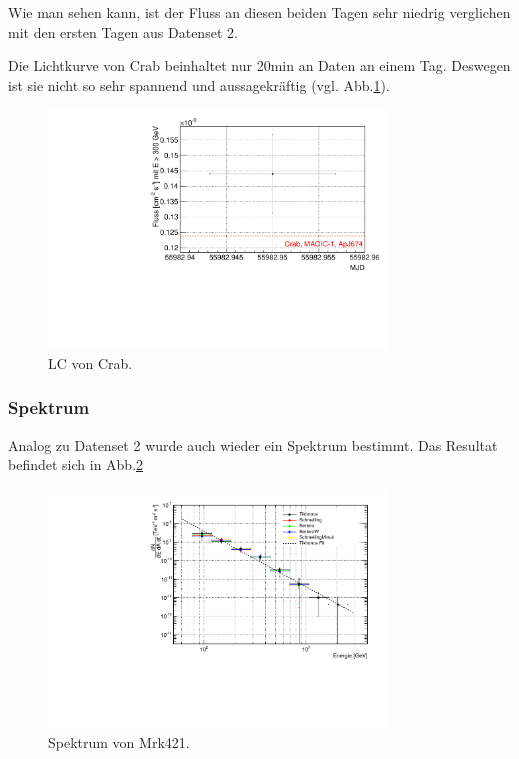 Wie man sehen kann, ist der Fluss an diesen beiden Tagen sehr niedrig verglichen mit den ersten Tagen aus Datenset 2.

Die Lichtkurve von Crab beinhaltet nur 20min an Daten an einem Tag.
Deswegen ist sie nicht so sehr spannend und aussagekräftig (vgl. Abb.\ref{Datenset1_LC_Crab}).

\begin{figure}
    \centering
    \includegraphics[width=0.8\textwidth]{./Plots/04_MrkAnalyse/Datenset1/Datenset1_LC_Crab.pdf}
    \caption{LC von Crab.}
    \label{Datenset1_LC_Crab}
\end{figure}

\FloatBarrier

\subsubsection{Spektrum}
Analog zu Datenset 2 wurde auch wieder ein Spektrum bestimmt.
Das Resultat befindet sich in Abb.\ref{Datenset1_Spektrum_Mrk421}

\begin{figure}
    \centering
    \includegraphics[width=0.8\textwidth]{./Plots/04_MrkAnalyse/Datenset1/Spektrum_Mrk421.pdf}
    \caption{Spektrum von Mrk421.}
    \label{Datenset1_Spektrum_Mrk421}
\end{figure}

